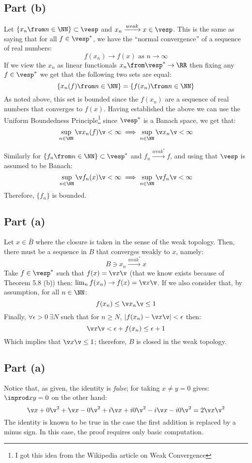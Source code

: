 \subsection*{Part (b)}
Let $\{x_n \from n\in \NN\}\subset \vesp$ and $x_n \xrightarrow{weak} x\in \vesp$. This is the same as saying that for all $f\in \vesp^*$, we have the ``normal convergence'' of a sequence of real numbers:
$$f(x_n) \to f(x) \text{ as } n\to \infty$$  
If we view the $x_n$ as linear functionals $x_n\from \vesp^*\to \RR$ then fixing any $f\in \vesp^*$ we get that the following two sets are equal:
$$\{x_n(f)\from n\in \NN\} = \{f(x_n)\from n\in \NN\}$$
As noted above, this set is bounded since the $f(x_n)$ are a sequence of real numbers that converges to $f(x)$. Having established the above we can use the Uniform Boundedness Principle\footnote{I got this idea from the Wikipedia article on Weak Convergence} since $\vesp^*$ is a Banach space, we get that:
$$\sup_{n\in \NN}\v x_n(f)\v < \infty \implies \sup_{n\in \NN}\v x_n \v < \infty $$

Similarly for $\{f_n \from n\in \NN\}\subset \vesp^*$ and $f_n\xrightarrow{weak^*} f$, and using that $\vesp$ is assumed to be Banach:
$$\sup_{n\in \NN}\v f_n(x)\v < \infty \implies \sup_{n\in \NN}\v f_n \v < \infty $$
Therefore, $\{f_n\}$ is bounded.

\subsection*{Part (a)}
Let $x\in \bar B$ where the closure is taken in the sense of the weak topology. Then, there must be a sequence in $B$ that converges weakly to $x$, namely:  
$$B \ni x_n\xrightarrow{weak^*} x$$
Take $f\in \vesp^*$ such that $f(x)=\v x\v$ (that we know exists because of Theorem 5.8 (b)) then: $\lim_n f(x_n)\to f(x) = \v x\v$. If we also consider that, by assumption, for all $n\in \NN$:
$$f(x_n) \leq \v x_n \v \leq 1$$
Finally, $\forall \epsilon>0\ \exists N$ such that for $n\geq N$, $|f(x_n) - \v x\v|<\epsilon$ then:
$$\v x\v < \epsilon +f(x_n)\leq \epsilon +1$$
Which implies that  $\v x\v\leq 1$; therefore, $B$ is closed in the weak topology.

\subsection*{Part (a)}
Notice that, as given, the identity is \emph{false}; for taking $x\neq y =0$ gives: $\inprod xy = 0$ on the other hand:
$$\v x + 0\v^2 +\v x - 0\v^2 + i\v x +i0\v^2 - i\v x-i0\v^2= 2\v x\v^2$$
The identity is known to be true in the case the first addition is replaced by a minus sign. In this case, the proof requires only basic computation.
